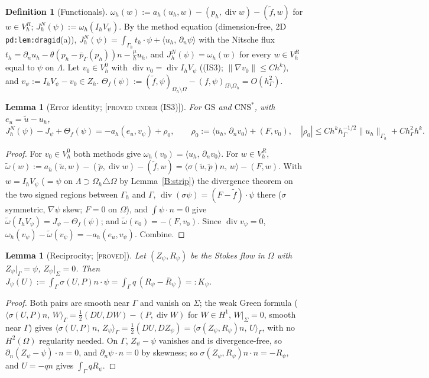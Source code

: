 \documentclass[11pt,reqno]{amsart}
\theoremstyle{plain}
\newtheorem{lemma}[theorem]{Lemma}
\theoremstyle{definition}
\newtheorem{definition}[theorem]{Definition}
\newcommand{\status}[1]{\textup{\textsc{[#1]}}}
\newcommand{\hG}{h_\Gamma}
\newcommand{\Gh}{\Gamma_h}
\newcommand{\Oh}{\Omega_h}
\newcommand{\VR}{V_h^R}
\newcommand{\VO}{V_h^0}
\newcommand{\Zh}{Z_h}
\newcommand{\dn}{\partial_n}
\newcommand{\ut}{\tilde u}
\newcommand{\pt}{\tilde p}
\newcommand{\ft}{\tilde f}
\newcommand{\pbG}{\bar p_{\Gamma}}
\newcommand{\ip}[2]{\langle #1,\, #2\rangle}
\newcommand{\norm}[1]{\lVert #1\rVert}
\newcommand{\GS}{\mathrm{GS}}
\newcommand{\CNS}{\mathrm{CNS}^\ast}
\renewcommand{\div}{\operatorname{div}}
\begin{document}
\begin{definition}[Functionals]\label{B:def}
$\omega_h(w):=a_h(u_h,w)-(p_h,\div w)-(\ft,w)$ for $w\in\VR$; $J^N_h(\psi):=\omega_h(I_hV_\psi)$. By the method equation (dimension-free, 2D \texttt{pd:lem:dragid}(a)), $J^N_h(\psi)=\int_{\Gh}t_h\cdot\psi+\ip{u_h}{\dn\psi}$ with the Nitsche flux $t_h=\dn u_h-\theta(p_h-\pbG(p_h))n-\frac\mu hu_h$, and $J^N_h(\psi)=\omega_h(w)$ for every $w\in\VR$ equal to $\psi$ on $\Lambda$. Let $v_0\in\VO$ with $\div v_0=\div I_hV_\psi$ ((IS3); $\norm{\nabla v_0}\le Ch^k$), and $v_\psi:=I_hV_\psi-v_0\in\Zh$. $\Theta_f(\psi):=(\ft,\psi)_{\Oh\setminus\Omega}-(f,\psi)_{\Omega\setminus\Oh}=O(\hG^2)$.
\end{definition}

\begin{lemma}[Error identity; \status{proved under (IS3)}]\label{B:id}
For $\GS$ and $\CNS$, with $e_u=\ut-u_h$,
\[
J^N_h(\psi)-J_\psi+\Theta_f(\psi)=-a_h(e_u,v_\psi)+\rho_0,\qquad\rho_0:=\ip{u_h}{\dn v_0}+(F,v_0),\quad|\rho_0|\le Ch^k\hG^{-1/2}\norm{u_h}_{\Gh}+C\hG^2h^k .
\]
\end{lemma}
\begin{proof}
For $v_0\in\VO$ both methods give $\omega_h(v_0)=\ip{u_h}{\dn v_0}$. For $w\in\VR$, $\tilde\omega(w):=a_h(\ut,w)-(\pt,\div w)-(\ft,w)=\ip{\sigma(\ut,\pt)n}w-(F,w)$. With $w=I_hV_\psi$ ($=\psi$ on $\Lambda\supset\Oh\triangle\Omega$ by Lemma~\ref{B:strip}) the divergence theorem on the two signed regions between $\Gh$ and $\Gamma$, $\div(\sigma\psi)=(F-\ft)\cdot\psi$ there ($\sigma$ symmetric, $\nabla\psi$ skew; $F=0$ on $\Omega$), and $\int\psi\cdot n=0$ give $\tilde\omega(I_hV_\psi)=J_\psi-\Theta_f(\psi)$; and $\tilde\omega(v_0)=-(F,v_0)$. Since $\div v_\psi=0$, $\omega_h(v_\psi)-\tilde\omega(v_\psi)=-a_h(e_u,v_\psi)$. Combine.
\end{proof}

\begin{lemma}[Reciprocity; \status{proved}]\label{B:recip}
Let $(Z_\psi,R_\psi)$ be the Stokes flow in $\Omega$ with $Z_\psi|_\Gamma=\psi$, $Z_\psi|_\Sigma=0$. Then $J_\psi(U):=\int_\Gamma\sigma(U,P)n\cdot\psi=\int_\Gamma q\,(R_\psi-\bar R_\psi)=:K_\psi$.
\end{lemma}
\begin{proof}
Both pairs are smooth near $\Gamma$ and vanish on $\Sigma$; the weak Green formula ($\ip{\sigma(U,P)n}{W}_\Gamma=\frac12(DU,DW)-(P,\div W)$ for $W\in H^1$, $W|_\Sigma=0$, smooth near $\Gamma$) gives $\ip{\sigma(U,P)n}{Z_\psi}_\Gamma=\frac12(DU,DZ_\psi)=\ip{\sigma(Z_\psi,R_\psi)n}U_\Gamma$, with no $H^2(\Omega)$ regularity needed. On $\Gamma$, $Z_\psi-\psi$ vanishes and is divergence-free, so $\dn(Z_\psi-\psi)\cdot n=0$, and $\dn\psi\cdot n=0$ by skewness; so $\sigma(Z_\psi,R_\psi)n\cdot n=-R_\psi$, and $U=-qn$ gives $\int_\Gamma qR_\psi$.
\end{proof}
\end{document}
